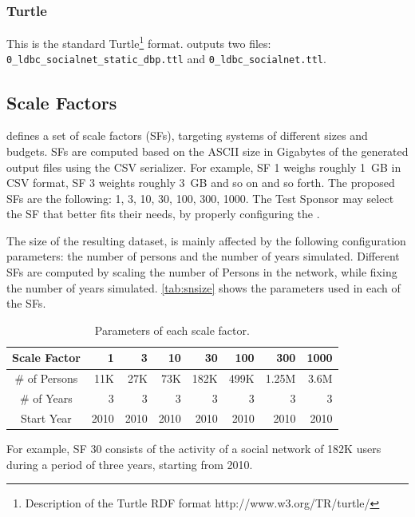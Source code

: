 






\subsubsection{Turtle}

This is the standard Turtle\footnote{Description of
the Turtle RDF format http://www.w3.org/TR/turtle/} format. \datagen outputs
two files: \texttt{0\_ldbc\_socialnet\_static\_dbp.ttl} and \texttt{0\_ldbc\_socialnet.ttl}.

\subsection{Scale Factors}

\ldbcsnb defines a set of scale factors (SFs), targeting systems of different
sizes and budgets.  SFs are computed based on the ASCII size in Gigabytes of
the generated output files using the CSV serializer. For example, SF 1 weighs roughly 1~GB in CSV
format, SF 3 weights roughly 3~GB and so on and so forth.  The proposed SFs are
the following: 1, 3, 10, 30, 100, 300, 1000. The Test Sponsor may select the SF
that better fits their needs, by properly configuring the \datagen.

The size of the resulting dataset, is mainly affected by the following
configuration parameters: the number of persons and the number of years
simulated. Different SFs are computed by scaling the number of Persons in
the network, while fixing the number of years simulated.
\autoref{tab:snsize} shows the parameters used in each of the SFs.

\begin{table}[H]
\centering
\begin{tabular}{|c||r|r|r|r|r|r|r|}
\hline  Scale Factor  & 1 &  3 & 10 & 30 & 100 & 300 & 1000 \\
\hline  \# of Persons  & 11K &  27K & 73K & 182K & 499K & 1.25M & 3.6M \\
\hline  \# of Years  & 3 &  3 & 3 & 3 & 3 & 3 & 3 \\
\hline  Start Year & 2010 &  2010 & 2010 & 2010 & 2010 & 2010 & 2010 \\
\hline
\end{tabular}
\centering
\caption{Parameters of each scale factor.}
\label{tab:snsize}
\end{table}

For example, SF 30 consists of the activity of a social network of 182K users
during a period of three years, starting from 2010.


